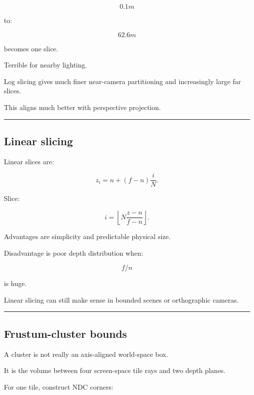 \[
0.1m
\]

to:

\[
62.6m
\]

becomes one slice.

Terrible for nearby lighting.

Log slicing gives much finer near-camera partitioning and increasingly large far slices.

This aligns much better with perspective projection.

\begin{center}\rule{0.5\linewidth}{0.5pt}\end{center}

\subsection{Linear slicing}\label{04-visual-computing-ii-ch040-linear-slicing}

\hypertarget{04-visual-computing-ii-ch040-linear-slicing}{}

Linear slices are:

\[
\boxed{
z_i=
n+
(f-n)\frac iN.
}
\]

Slice:

\[
\boxed{
i=
\left\lfloor
N
\frac{z-n}{f-n}
\right\rfloor.
}
\]

Advantages are simplicity and predictable physical size.

Disadvantage is poor depth distribution when:

\[
f/n
\]

is huge.

Linear slicing can still make sense in bounded scenes or orthographic cameras.

\begin{center}\rule{0.5\linewidth}{0.5pt}\end{center}

\subsection{Frustum-cluster bounds}\label{04-visual-computing-ii-ch040-frustum-cluster-bounds}

\hypertarget{04-visual-computing-ii-ch040-frustum-cluster-bounds}{}

A cluster is not really an axis-aligned world-space box.

It is the volume between four screen-space tile rays and two depth planes.

For one tile, construct NDC corners:

